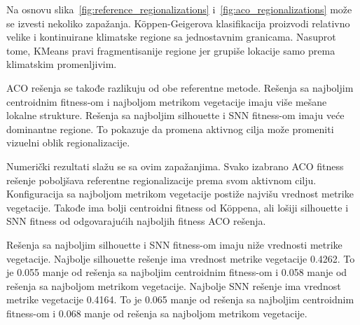 \documentclass[11pt]{article}
\begin{document}
\begin{table}[H]
\centering
\caption{Poređenje izabranih regionalizacija.}
\label{tab:regionalization_summary}
\end{table}

Na osnovu slika~\ref{fig:reference_regionalizations} i~\ref{fig:aco_regionalizations} može se izvesti nekoliko zapažanja. Köppen-Geigerova klasifikacija proizvodi relativno velike i kontinuirane klimatske regione sa jednostavnim granicama. Nasuprot tome, KMeans pravi fragmentisanije regione jer grupiše lokacije samo prema klimatskim promenljivim.

ACO rešenja se takođe razlikuju od obe referentne metode. Rešenja sa najboljim centroidnim fitness-om i najboljom metrikom vegetacije imaju više mešane lokalne strukture. Rešenja sa najboljim silhouette i SNN fitness-om imaju veće dominantne regione. To pokazuje da promena aktivnog cilja može promeniti vizuelni oblik regionalizacije.

Numerički rezultati slažu se sa ovim zapažanjima. Svako izabrano ACO fitness rešenje poboljšava referentne regionalizacije prema svom aktivnom cilju. Konfiguracija sa najboljom metrikom vegetacije postiže najvišu vrednost metrike vegetacije. Takođe ima bolji centroidni fitness od Köppena, ali lošiji silhouette i SNN fitness od odgovarajućih najboljih fitness ACO rešenja.

Rešenja sa najboljim silhouette i SNN fitness-om imaju niže vrednosti metrike vegetacije. Najbolje silhouette rešenje ima vrednost metrike vegetacije 0.4262. To je 0.055 manje od rešenja sa najboljim centroidnim fitness-om i 0.058 manje od rešenja sa najboljom metrikom vegetacije. Najbolje SNN rešenje ima vrednost metrike vegetacije 0.4164. To je 0.065 manje od rešenja sa najboljim centroidnim fitness-om i 0.068 manje od rešenja sa najboljom metrikom vegetacije.
\end{document}
